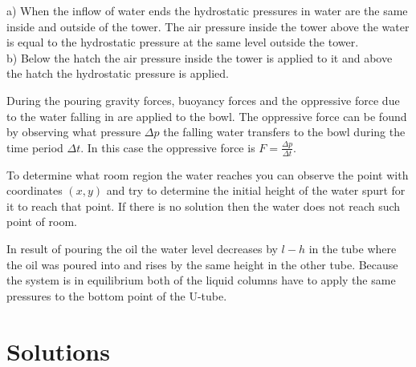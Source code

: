 \documentclass[11pt]{article}
\begin{document}

\hinteng
a) When the inflow of water ends the hydrostatic pressures in water are the same inside and outside of the tower. The air pressure inside the tower above the water is equal to the hydrostatic pressure at the same level outside the tower.\\
b) Below the hatch the air pressure inside the tower is applied to it and above the hatch the hydrostatic pressure is applied.
\probend
\bigskip


\hinteng
During the pouring gravity forces, buoyancy forces and the oppressive force due to the water falling in are applied to the bowl. The oppressive force can be found by observing what pressure $\Delta p$ the falling water transfers to the bowl during the time period $\Delta t$. In this case the oppressive force is $F = \frac{\Delta p}{\Delta t}$.
\probend
\bigskip


\hinteng
To determine what room region the water reaches you can observe the point with coordinates $(x, y)$ and try to determine the initial height of the water spurt for it to reach that point. If there is no solution then the water does not reach such point of room.
\probend
\bigskip


\hinteng
In result of pouring the oil the water level decreases by $l - h$ in the tube where the oil was poured into and rises by the same height in the other tube. Because the system is in equilibrium both of the liquid columns have to apply the same pressures to the bottom point of the U-tube.
\probend
\bigskip
\newpage\section{Solutions}
        \toggleSolution
        
\end{document}
